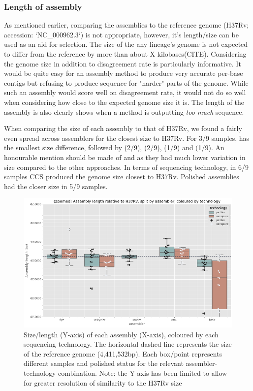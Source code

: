 \subsubsection{Length of assembly}

As mentioned earlier, comparing the assemblies to the \mtb{} reference genome (H37Rv; accession: `NC\_000962.3`) is not appropriate, however, it's length/size can be used as an aid for selection. The size of the any lineage's genome is not expected to differ from the reference by more than about X kilobases(CITE). Considering the genome size in addition to disagreement rate is particularly informative. It would be quite easy for an assembly method to produce very accurate per-base contigs but refusing to produce sequence for "harder" parts of the genome. While such an assembly would score well on disagreement rate, it would not do so well when considering how close to the expected genome size it is. The length of the assembly is also clearly shows when a method is outputting \textit{too much} sequence.

When comparing the size of each assembly to that of H37Rv, we found a fairly even spread across assemblers for the closest size to H37Rv. For 3/9 samples,  has the smallest size difference, followed by  (2/9),  (2/9),  (1/9) and  (1/9). An honourable mention should be made of  and  as they had much lower variation in size compared to the other approaches. In terms of sequencing technology, in 6/9 samples CCS produced the genome size closest to H37Rv. Polished assemblies had the closer size in 5/9 samples.



\begin{figure}
\includegraphics[width=1.0\textwidth]{Chapter2/Figs/asm_len.png}
\centering
\caption{Size/length (Y-axis) of each assembly (X-axis), coloured by each sequencing technology. The horizontal dashed line represents the size of the \mtb{} reference genome (4,411,532bp). Each box/point represents different samples and polished status for the relevant assembler-technology combination. Note: the Y-axis has been limited to allow for greater resolution of similarity to the H37Rv size}
\label{fig:asm_len}
\end{figure}



